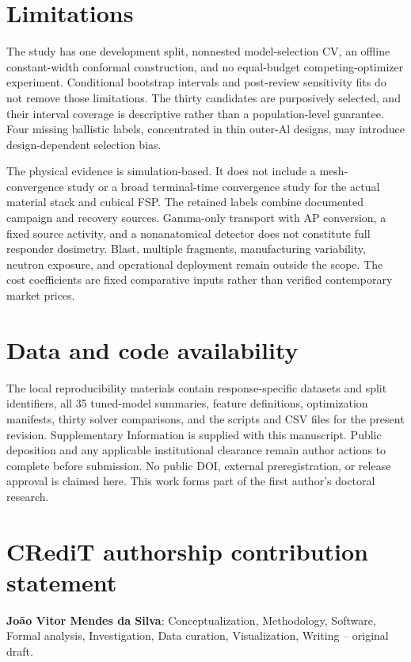 \documentclass[12pt]{elsarticle}
\begin{document}
\section*{Limitations}
The study has one development split, nonnested model-selection CV, an offline constant-width conformal construction, and no equal-budget competing-optimizer experiment. Conditional bootstrap intervals and post-review sensitivity fits do not remove those limitations. The thirty candidates are purposively selected, and their interval coverage is descriptive rather than a population-level guarantee. Four missing ballistic labels, concentrated in thin outer-Al designs, may introduce design-dependent selection bias.

The physical evidence is simulation-based. It does not include a mesh-convergence study or a broad terminal-time convergence study for the actual material stack and cubical FSP. The retained labels combine documented campaign and recovery sources. Gamma-only transport with AP conversion, a fixed source activity, and a nonanatomical detector does not constitute full responder dosimetry. Blast, multiple fragments, manufacturing variability, neutron exposure, and operational deployment remain outside the scope. The cost coefficients are fixed comparative inputs rather than verified contemporary market prices.

\section*{Data and code availability}
The local reproducibility materials contain response-specific datasets and split identifiers, all 35 tuned-model summaries, feature definitions, optimization manifests, thirty solver comparisons, and the scripts and CSV files for the present revision. Supplementary Information is supplied with this manuscript. Public deposition and any applicable institutional clearance remain author actions to complete before submission. No public DOI, external preregistration, or release approval is claimed here. This work forms part of the first author's doctoral research.

\section*{CRediT authorship contribution statement}
	
	\textbf{Jo\~ao Vitor Mendes da Silva}: Conceptualization, Methodology,
	Software, Formal analysis, Investigation, Data curation, Visualization,
	Writing -- original draft.
	
\end{document}
